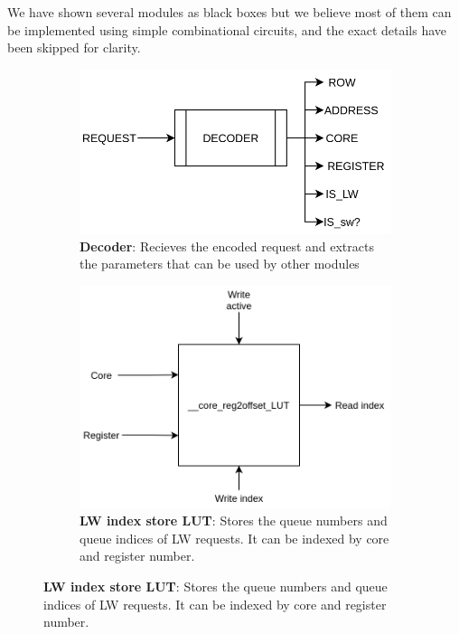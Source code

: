 \documentclass[hidelinks,12pt]{article}
\begin{document}
We have shown several modules as black boxes but we believe most of them can be implemented using simple combinational circuits,
and the exact details have been skipped for clarity.
\begin{figure}[H]
    \centering
    \begin{subfigure}[h]{\textwidth}
        \begin{center}
            \includegraphics[scale=0.4]{img/decoder.png}
            \caption{\textbf{Decoder}: Recieves the encoded request and extracts the parameters that can be used by other modules}

        \end{center}

    \end{subfigure}

    \begin{subfigure}[h]{\textwidth}
        \begin{center}
            \includegraphics[scale=0.4]{img/core_reg_LUT.png}
            \caption{\textbf{LW index store LUT}: Stores the queue numbers and queue indices of LW requests. It can be indexed by core and register number. }

        \end{center}

    \end{subfigure}

\end{figure}
\end{document}
